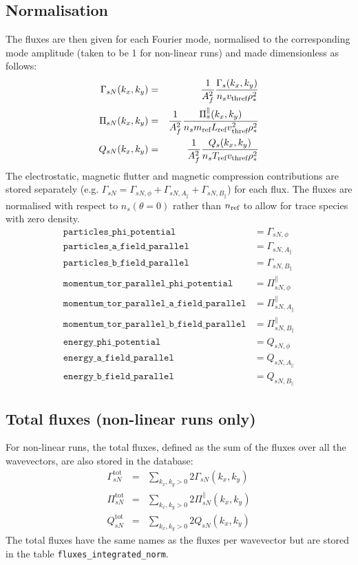 \documentclass[a4paper]{report}
\begin{document}
\subsection{Normalisation}
The fluxes are then given for each Fourier mode, normalised to the corresponding mode amplitude (taken to be 1 for non-linear runs) and made dimensionless as follows:
\begin{eqnarray}
 \Gamma_{sN}(k_x,k_y) &=& \frac{1}{A_f^2}\frac{\Gamma_s(k_x,k_y)}{n_s v_\textrm{thref} \rho_*^2}\\
 \Pi_{sN}(k_x,k_y) &=& \frac{1}{A_f^2}\frac{\Pi^\parallel_s(k_x,k_y)}{n_s m_{\textrm{ref}} L_{\textrm{ref}} v_\textrm{thref}^2 \rho_*^2}\\
 Q_{sN}(k_x,k_y) &=& \frac{1}{A_f^2}\frac{Q_s(k_x,k_y)}{n_s T_{\textrm{ref}} v_\textrm{thref} \rho_*^2}
\end{eqnarray}
The electrostatic, magnetic flutter and magnetic compression contributions are stored separately (e.g. $\Gamma_{sN}=\Gamma_{sN,\phi}+\Gamma_{sN,A_\parallel}+\Gamma_{sN,B_\parallel}$) for each flux. The fluxes are normalised with respect to $n_s(\theta=0)$ rather than $n_{\textrm{ref}}$ to allow for trace species with zero density.
\begin{align*}
 \texttt{particles\_phi\_potential} &= \Gamma_{sN,\phi} \\
 \texttt{particles\_a\_field\_parallel} &= \Gamma_{sN,A_\parallel} \\
 \texttt{particles\_b\_field\_parallel} &= \Gamma_{sN,B_\parallel} \\
 \texttt{momentum\_tor\_parallel\_phi\_potential} &= \Pi^\parallel_{sN,\phi} \\
 \texttt{momentum\_tor\_parallel\_a\_field\_parallel} &= \Pi^\parallel_{sN,A_\parallel} \\
 \texttt{momentum\_tor\_parallel\_b\_field\_parallel} &= \Pi^\parallel_{sN,B_\parallel} \\
 \texttt{energy\_phi\_potential} &= Q_{sN,\phi} \\
 \texttt{energy\_a\_field\_parallel} &= Q_{sN,A_\parallel} \\
 \texttt{energy\_b\_field\_parallel} &= Q_{sN,B_\parallel}
\end{align*}

\subsection{Total fluxes (non-linear runs only)}
For non-linear runs, the total fluxes,  defined as the sum of the fluxes over all the wavevectors, are also stored in the database:
\begin{eqnarray}
\Gamma_{sN}^\textrm{tot} &=& \sum_{k_x, k_y>0} 2\Gamma_{sN}(k_x,k_y)\\
\Pi_{sN}^\textrm{tot} &=&  \sum_{k_x, k_y>0} 2\Pi^\parallel_{sN}(k_x,k_y)\\
Q_{sN}^\textrm{tot} &=&  \sum_{k_x, k_y>0} 2Q_{sN}(k_x,k_y) 
\end{eqnarray}
The total fluxes have the same names as the fluxes per wavevector but are stored in the table \texttt{fluxes\_integrated\_norm}.
\end{document}
